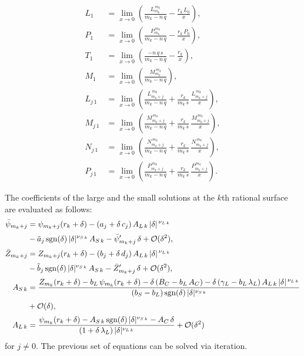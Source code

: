 \documentclass[12pt,prb,aps]{revtex4-1}
\begin{document}
\begin{align}
L_1&= \lim_{x\rightarrow 0}\left(\frac{L_{m_k}^{\,m_k}}{m_k-n\,q}-\frac{r_k\,L_0}{x}\right),\\[0.5ex]
P_1&=  \lim_{x\rightarrow 0}\left(\frac{P_{m_k}^{\,m_k}}{m_k-n\,q}-\frac{r_k\,P_0}{x}\right),\\[0.5ex]
T_1 &= \lim_{x\rightarrow 0}\left(\frac{-n\,q\,s}{m_k-n\,q}-\frac{r_k}{x}\right),\\[0.5ex]
M_1 &= \lim_{x\rightarrow 0}\left(\frac{M_{m_k}^{\,m_k}}{m_k-n\,q}\right),\\[0.5ex]
L_{j\,1}&=\lim_{x\rightarrow 0}\left(\frac{L_{m_k+j}^{\,m_k}}{m_k-n\,q}+\frac{r_k}{m_k\,s}\,\frac{L_{m_k+j}^{\,m_k}}{x}\right),\\[0.5ex]
M_{j\,1}&=\lim_{x\rightarrow 0}\left(\frac{M_{m_k+j}^{\,m_k}}{m_k-n\,q}+\frac{r_k}{m_k\,s}\,\frac{M_{m_k+j}^{\,m_k}}{x}\right),\\[0.5ex]
N_{j\,1}&=\lim_{x\rightarrow 0}\left(\frac{N_{m_k+j}^{\,m_k}}{m_k-n\,q}+\frac{r_k}{m_k\,s}\,\frac{N_{m_k+j}^{\,m_k}}{x}\right),\\[0.5ex]
P_{j\,1}&=\lim_{x\rightarrow 0}\left(\frac{P_{m_k+j}^{\,m_k}}{m_k-n\,q}+\frac{r_k}{m_k\,s}\,\frac{P_{m_k+j}^{\,m_k}}{x}\right).
\end{align}

The coefficients of the large and the small solutions at the $k$th rational surface are evaluated as follows:
\begin{align}
\bar{\psi}_{m_k+j} &= \psi_{m_k+j}(r_k+\delta)- (a_j+\delta\,c_j)\,A_{L\,k}\,|\delta|^{\,\nu_{L\,k}}\nonumber\\[0.5ex]
\phantom{=}&-\tilde{a}_j\,{\rm sgn}(\delta)\,|\delta|^{\nu_{S\,k}}\,A_{S\,k}-\bar{\psi}'_{m_k+j}\,\delta+{\cal O}(\delta^2),\\[0.5ex]
\bar{Z}_{m_k+j}&= Z_{m_k+j}(r_k+\delta)- (b_j+\delta\,d_j)\,A_{L\,k}\,|\delta|^{\,\nu_{L\,k}}\nonumber\\[0.5ex]
\phantom{=}&-\tilde{b}_j\,{\rm sgn}(\delta)\,|\delta|^{\nu_{S\,k}}\,A_{S\,k}-\bar{Z}'_{m_k+j}\,\delta+{\cal O}(\delta^2),\\[0.5ex]
A_{S\,k} &= \frac{Z_{m_k}(r_k+\delta)-b_L\,\psi_{m_k}(r_k+\delta)-\delta\,(B_C-b_L\,A_C)-\delta\,(\gamma_L-b_L\,\lambda_L)\,A_{L\,k}\,|\delta|^{\,\nu_{L\,k}}}{
(b_S-b_L)\,{\rm sgn}(\delta)\,|\delta|^{\nu_{S\,k}}}\nonumber\\[0.5ex]
&+{\cal O}(\delta),\\[0.5ex]
A_{L\,k} &= \frac{\psi_{m_k}(r_k+\delta)-A_{S\,k}\,{\rm sgn}(\delta)\,|\delta|^{\nu_{S\,k}}-A_C\,\delta}{(1+\delta\,\lambda_L)\,|\delta|^{\nu_{L\,k}}}+{\cal O}(\delta^2)
\end{align}
for $j\neq 0$. The previous set of equations can be solved via iteration.
\end{document}
